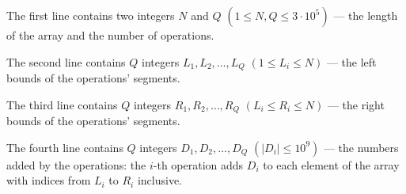 The first line contains two integers $N$ and $Q$ $(1 \le N, Q \le 3 \cdot 10^5)$ --- the length of the array and the number of operations.

The second line contains $Q$ integers $L_1, L_2, \ldots, L_Q$ $(1 \le L_i \le N)$ --- the left bounds of the operations' segments.

The third line contains $Q$ integers $R_1, R_2, \ldots, R_Q$ $(L_i \le R_i \le N)$ --- the right bounds of the operations' segments.

The fourth line contains $Q$ integers $D_1, D_2, \ldots, D_Q$ $(|D_i| \le 10^9)$ --- the numbers added by the operations: the $i$-th operation adds $D_i$ to each element of the array with indices from $L_i$ to $R_i$ inclusive.
